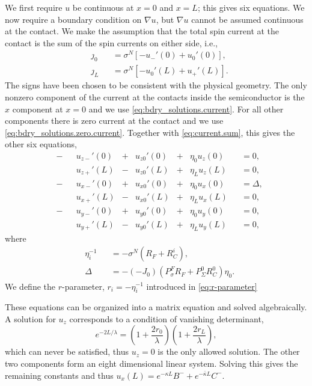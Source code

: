 We first require $u$ be continuous at $x = 0$ and $x = L$; this gives six equations.
We now require a boundary condition on $∇u$, but $∇u$ cannot be assumed continuous at the contact.
We make the assumption that the total spin current at the contact
is the sum of the spin currents on either side, i.e.,
\begin{subequations}
  \label{eq:current.sum}
  \begin{alignat}{2}
    & ȷ_0 && = σ^N \left[ - u_-'(0) + u_0'(0) \right] , \\
    & ȷ_L && = σ^N \left[ - u_0'(L) + u_+'(L) \right] .
  \end{alignat}
\end{subequations}
The signs have been chosen to be consistent with the physical geometry.
The only nonzero component of the current at the contacts inside the semiconductor
is the $x$ component at $x = 0$ and we use \cref{eq:bdry_solutions.current}.
For all other components there is zero current at the contact and we use
\cref{eq:bdry_solutions.zero.current}.
Together with \cref{eq:current.sum}, this gives the other six equations,
\begin{subequations}
  \begin{alignat}{8}
    & - & {} & u_{z-}'(0) & {}+{} & u_{z0}'(0) & {}+{} & η_0 u_z(0) && = 0 , \\
    &   & {} & u_{z+}'(L) & {}-{} & u_{z0}'(L) & {}+{} & η_L u_z(L) && = 0 , \\
    & - & {} & u_{x-}'(0) & {}+{} & u_{x0}'(0) & {}+{} & η_0 u_x(0) && = Δ , \\
    &   & {} & u_{x+}'(L) & {}-{} & u_{x0}'(L) & {}+{} & η_L u_x(L) && = 0 , \\
    & - & {} & u_{y-}'(0) & {}+{} & u_{y0}'(0) & {}+{} & η_0 u_y(0) && = 0 , \\
    &   & {} & u_{y+}'(L) & {}-{} & u_{y0}'(L) & {}+{} & η_L u_y(L) && = 0 ,
  \end{alignat}
\end{subequations}
where
\begin{subequations}
  \begin{alignat}{2}
  & η_i^{-1} && = - σ^N \left( R_F + R_C^i \right) , \\
  & Δ && = - (- J_0) \left( P_σ^F R_F + P_Σ^0 R_C^0 \right) η_0 .
  \end{alignat}
\end{subequations}
We define the $r$-parameter, $r_i = - η_i^{-1}$ introduced in \cref{eq:r-parameter}

These equations can be organized into a matrix equation and solved algebraically.
A solution for $u_z$ corresponds to a condition of vanishing determinant,
\begin{equation}
  e^{-2 L / λ} = \left( 1 + \frac{2 r_0}{λ} \right) \left( 1 + \frac{2 r_L}{λ} \right) ,
\end{equation}
which can never be satisfied, thus $u_z = 0$ is the only allowed solution.
The other two components form an eight dimensional linear system.
Solving this gives the remaining constants and thus
$u_x (L) = e^{- κ L} B^- + e^{- \bar{κ} L} C^-$.

